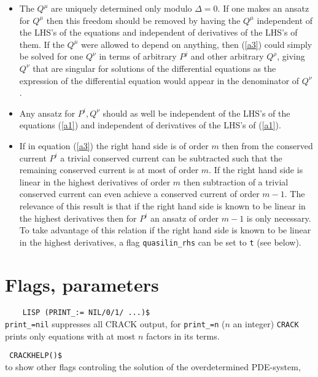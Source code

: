 \documentclass[12pt]{article}
\begin{document}
\begin{itemize}
\item The $Q^{\mu}$ are uniquely determined only modulo $\Delta=0$.
If one makes an ansatz for $Q^{\mu}$ then this freedom should be removed
by having
the $Q^{\mu}$ independent of the LHS's of the equations and independent of
derivatives of the LHS's of them. If the $Q^{\mu}$ were allowed to depend on
anything, then (\ref{a3}) could simply be solved for one $Q^{\nu}$ in terms of
arbitrary $P^j$ and other arbitrary $Q^{\rho}$, giving $Q^{\nu}$ that are
singular for solutions of the differential equations as the expression
of the differential equation would appear in the denominator of $Q^{\nu}$.

\item Any ansatz for $P^i,Q^{\nu}$ should
as well be independent of the LHS's of the equations (\ref{a1}) and 
independent of derivatives of the LHS's of (\ref{a1}).

\item If in equation (\ref{a3}) the right hand side is of order $m$ then
from the conserved current $P^i$ a trivial conserved current can be
subtracted such that the remaining conserved current is at most of order $m$.
If the right hand side is linear in the highest derivatives of order
$m$ then subtraction of a trivial conserved current can even achieve a
conserved current of order $m-1$. The relevance of this result is that
if the right hand side is known to be linear in the highest derivatives
then for $P^i$ an ansatz of order $m-1$ is only necessary. To take
advantage of this relation
if the right hand side is known to be linear in the highest
derivatives, a flag {\tt quasilin\_rhs} can be set to {\tt t} (see
below). 

\end{itemize}

\section{Flags, parameters}

\verb+    LISP (PRINT_:= NIL/0/1/ ...)$+ \\
\verb+print_=nil+ suppresses all CRACK output, for \verb+print_=n+ 
($n$ an integer) 
{\tt CRACK} prints only equations with at most $n$ factors in its terms.


\verb+ CRACKHELP()$+ \\
to show other flags controling the solution of the overdetermined PDE-system,
\end{document}
